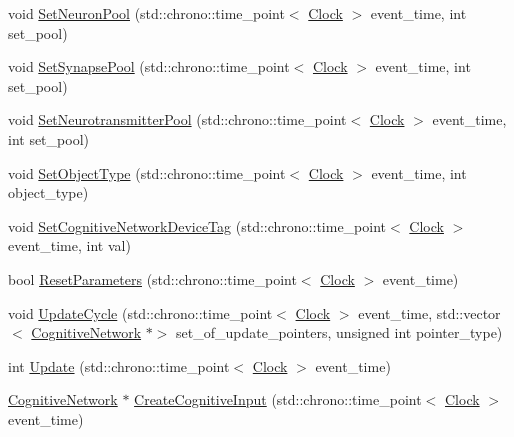 \begin{DoxyCompactItemize}
\item 
void \mbox{\hyperlink{classCognitiveNetwork_a2e1137387c4165dd3f91a758d2ce7f34}{Set\+Neuron\+Pool}} (std\+::chrono\+::time\+\_\+point$<$ \mbox{\hyperlink{universe_8h_a0ef8d951d1ca5ab3cfaf7ab4c7a6fd80}{Clock}} $>$ event\+\_\+time, int set\+\_\+pool)
\item 
void \mbox{\hyperlink{classCognitiveNetwork_a9d2b7d1de9e7148a403fc15f7f3fd1bf}{Set\+Synapse\+Pool}} (std\+::chrono\+::time\+\_\+point$<$ \mbox{\hyperlink{universe_8h_a0ef8d951d1ca5ab3cfaf7ab4c7a6fd80}{Clock}} $>$ event\+\_\+time, int set\+\_\+pool)
\item 
void \mbox{\hyperlink{classCognitiveNetwork_a84f808251f67ced0edad2e1dd4d47039}{Set\+Neurotransmitter\+Pool}} (std\+::chrono\+::time\+\_\+point$<$ \mbox{\hyperlink{universe_8h_a0ef8d951d1ca5ab3cfaf7ab4c7a6fd80}{Clock}} $>$ event\+\_\+time, int set\+\_\+pool)
\item 
void \mbox{\hyperlink{classCognitiveNetwork_ad95a0b25c7f61fc52322938eb13c9e3e}{Set\+Object\+Type}} (std\+::chrono\+::time\+\_\+point$<$ \mbox{\hyperlink{universe_8h_a0ef8d951d1ca5ab3cfaf7ab4c7a6fd80}{Clock}} $>$ event\+\_\+time, int object\+\_\+type)
\item 
void \mbox{\hyperlink{classCognitiveNetwork_a0e8a64151a2446fc16a074ad2de325df}{Set\+Cognitive\+Network\+Device\+Tag}} (std\+::chrono\+::time\+\_\+point$<$ \mbox{\hyperlink{universe_8h_a0ef8d951d1ca5ab3cfaf7ab4c7a6fd80}{Clock}} $>$ event\+\_\+time, int val)
\item 
bool \mbox{\hyperlink{classCognitiveNetwork_a8af8ed2605263e57a32e457aba2af99d}{Reset\+Parameters}} (std\+::chrono\+::time\+\_\+point$<$ \mbox{\hyperlink{universe_8h_a0ef8d951d1ca5ab3cfaf7ab4c7a6fd80}{Clock}} $>$ event\+\_\+time)
\item 
void \mbox{\hyperlink{classCognitiveNetwork_aa37dda869174e4eef986cca4ce3e55d2}{Update\+Cycle}} (std\+::chrono\+::time\+\_\+point$<$ \mbox{\hyperlink{universe_8h_a0ef8d951d1ca5ab3cfaf7ab4c7a6fd80}{Clock}} $>$ event\+\_\+time, std\+::vector$<$ \mbox{\hyperlink{classCognitiveNetwork}{Cognitive\+Network}} $\ast$$>$ set\+\_\+of\+\_\+update\+\_\+pointers, unsigned int pointer\+\_\+type)
\item 
int \mbox{\hyperlink{classCognitiveNetwork_a05dccc7759456df13a732899a8f1f4c4}{Update}} (std\+::chrono\+::time\+\_\+point$<$ \mbox{\hyperlink{universe_8h_a0ef8d951d1ca5ab3cfaf7ab4c7a6fd80}{Clock}} $>$ event\+\_\+time)
\item 
\mbox{\hyperlink{classCognitiveNetwork}{Cognitive\+Network}} $\ast$ \mbox{\hyperlink{classCognitiveNetwork_add96197c3dc51d94d06edb480fbc4a38}{Create\+Cognitive\+Input}} (std\+::chrono\+::time\+\_\+point$<$ \mbox{\hyperlink{universe_8h_a0ef8d951d1ca5ab3cfaf7ab4c7a6fd80}{Clock}} $>$ event\+\_\+time)
$$
\end{DoxyCompactItemize}
